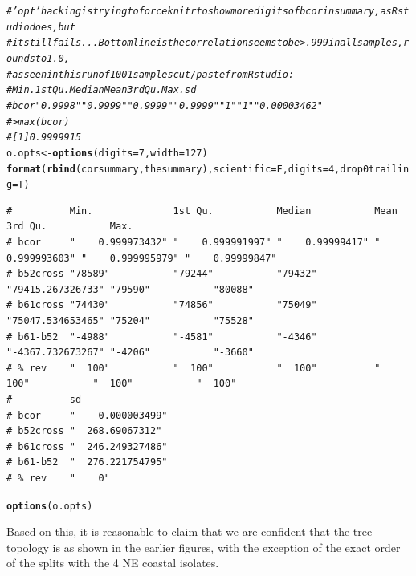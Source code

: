 \documentclass{article}\usepackage[]{graphicx}\usepackage[]{color}
\makeatletter
\newcommand{\hlnum}[1]{\textcolor[rgb]{0.686,0.059,0.569}{#1}}%
\newcommand{\hlcom}[1]{\textcolor[rgb]{0.678,0.584,0.686}{\textit{#1}}}%
\newcommand{\hlstd}[1]{\textcolor[rgb]{0.345,0.345,0.345}{#1}}%
\newcommand{\hlkwb}[1]{\textcolor[rgb]{0.69,0.353,0.396}{#1}}%
\newcommand{\hlkwc}[1]{\textcolor[rgb]{0.333,0.667,0.333}{#1}}%
\newcommand{\hlkwd}[1]{\textcolor[rgb]{0.737,0.353,0.396}{\textbf{#1}}}%
\newenvironment{kframe}{%
 \def\at@end@of@kframe{}%
 \ifinner\ifhmode%
  \def\at@end@of@kframe{\end{minipage}}%
  \begin{minipage}{\columnwidth}%
 \fi\fi%
 \def\FrameCommand##1{\hskip\@totalleftmargin \hskip-\fboxsep
 \colorbox{shadecolor}{##1}\hskip-\fboxsep
     \hskip-\linewidth \hskip-\@totalleftmargin \hskip\columnwidth}%
 \MakeFramed {\advance\hsize-\width
   \@totalleftmargin\z@ \linewidth\hsize
   \@setminipage}}%
 {\par\unskip\endMakeFramed%
 \at@end@of@kframe}
\newenvironment{knitrout}{}{} %
\makeatother
\begin{document}
\begin{knitrout}\footnotesize
{}\color{fgcolor}\begin{kframe}
\begin{alltt}
\hlcom{# 'opt' hacking is trying to force knitr to show more digits of bcor in summary, as Rstudio does, but}
\hlcom{# it still fails...  Bottom line is the correlation seems to be  > .999 in all samples, rounds to 1.0,}
\hlcom{# as seen in this run of 1001 samples cut/paste from Rstudio:}
\hlcom{#          Min.        1st Qu.     Median      Mean        3rd Qu. Max.   sd             }
\hlcom{# bcor     "   0.9998" "   0.9999" "   0.9999" "   0.9999" "   1"  "   1" "   0.00003462"}
\hlcom{# > max(bcor)}
\hlcom{# [1] 0.9999915}
\hlstd{o.opts} \hlkwb{<-} \hlkwd{options}\hlstd{(}\hlkwc{digits}\hlstd{=}\hlnum{7}\hlstd{,}\hlkwc{width}\hlstd{=}\hlnum{127}\hlstd{)}
\hlkwd{format}\hlstd{(}\hlkwd{rbind}\hlstd{(corsummary,thesummary),}\hlkwc{scientific}\hlstd{=F,}\hlkwc{digits}\hlstd{=}\hlnum{4}\hlstd{,}\hlkwc{drop0trailing}\hlstd{=T)}
\end{alltt}
\begin{verbatim}
#          Min.              1st Qu.           Median           Mean              3rd Qu.           Max.            
# bcor     "    0.999973432" "    0.999991997" "    0.99999417" "    0.999993603" "    0.999995979" "    0.99999847"
# b52cross "78589"           "79244"           "79432"          "79415.267326733" "79590"           "80088"         
# b61cross "74430"           "74856"           "75049"          "75047.534653465" "75204"           "75528"         
# b61-b52  "-4988"           "-4581"           "-4346"          "-4367.732673267" "-4206"           "-3660"         
# % rev    "  100"           "  100"           "  100"          "  100"           "  100"           "  100"         
#          sd               
# bcor     "    0.000003499"
# b52cross "  268.69067312" 
# b61cross "  246.249327486"
# b61-b52  "  276.221754795"
# % rev    "    0"
\end{verbatim}
\begin{alltt}
\hlkwd{options}\hlstd{(o.opts)}
\end{alltt}
\end{kframe}
\end{knitrout}

Based on this, it is reasonable to claim that we are confident that the tree topology is as shown in the earlier
figures, with the exception of the exact order of the splits with the 4 NE coastal isolates.
\end{document}
